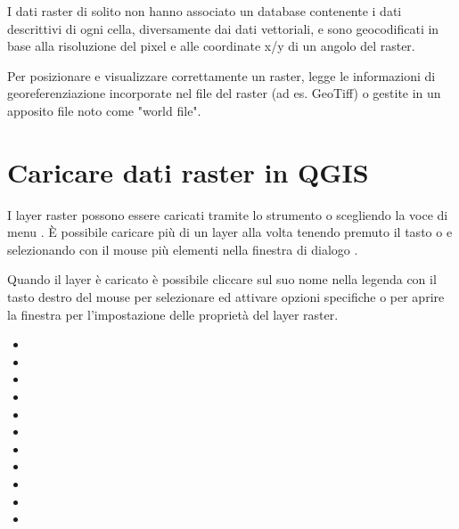 I dati raster di solito non hanno associato un database contenente i dati 
descrittivi di ogni cella, diversamente dai dati vettoriali, e sono geocodificati 
in base alla risoluzione del pixel e alle coordinate x/y di un angolo del raster.

Per posizionare e visualizzare correttamente un raster, \qg legge le informazioni di 
georeferenziazione incorporate nel file del raster (ad es. GeoTiff) o gestite in un 
apposito file noto come "world file".
	
\section{Caricare dati raster in QGIS}\label{label_loadraster}

I layer raster possono essere caricati tramite lo strumento  
o scegliendo la voce di menu  \arrow {}.
È possibile caricare più di un layer alla volta tenendo premuto il
tasto  o  e selezionando con il mouse 
più elementi nella finestra di dialogo .

Quando il layer è caricato è possibile cliccare sul suo nome nella legenda 
con il tasto destro del mouse per selezionare ed attivare opzioni specifiche o per
aprire la finestra per l'impostazione delle proprietà del layer raster.


\begin{itemize}[label=--]
\item {}
\item {}
\item {}
\item {}
\item {}
\item {}
\item {}
\item {}
\item {}
\item {}
\item {}
\end{itemize}
	

